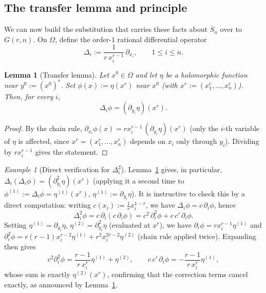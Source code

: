 \documentclass[11pt]{article}
\newtheorem{lemma}[theorem]{Lemma}
\theoremstyle{remark}
\newtheorem{example}[theorem]{Example}
\begin{document}
\subsection{The transfer lemma and principle}\label{sec:transfert}

We can now build the substitution that carries these facts about $S_n$ over to $G(r,n)$. On $\Omega$, define the order-$1$ rational differential operator
\[
\Delta_i := \frac{1}{r\,x_i^{r-1}}\,\partial_{x_i}, \qquad 1\le i\le n.
\]

\begin{lemma}[Transfer lemma]\label{lem:transfert}
Let $x^0\in\Omega$ and let $\eta$ be a holomorphic function near $y^0:=(x^0)^r$. Set $\phi(x):=\eta(x^r)$ near $x^0$ (with $x^r:=(x_1^r,\dots,x_n^r)$). Then, for every $i$,
\[
\Delta_i \phi = (\partial_{y_i}\eta)(x^r).
\]
\end{lemma}

\begin{proof}
By the chain rule, $\partial_{x_i}\phi(x) = r x_i^{r-1}\,(\partial_{y_i}\eta)(x^r)$ (only the $i$-th variable of $\eta$ is affected, since $x^r=(x_1^r,\dots,x_n^r)$ depends on $x_i$ only through $y_i$). Dividing by $rx_i^{r-1}$ gives the statement.
\end{proof}

\begin{example}[Direct verification for $\Delta_i^2$]\label{ex:delta2}
Lemma~\ref{lem:transfert} gives, in particular, $\Delta_i(\Delta_i\phi)=(\partial_{y_i}^2\eta)(x^r)$ (applying it a second time to $\phi^{(1)}:=\Delta_i\phi=\eta^{(1)}(x^r)$, $\eta^{(1)}:=\partial_{y_i}\eta$). It is instructive to check this by a direct computation: writing $c(x_i):=\frac{1}{r}x_i^{1-r}$, we have $\Delta_i\phi=c\,\partial_i\phi$, hence
\[
\Delta_i^2\phi = c\,\partial_i(c\,\partial_i\phi) = c^2\,\partial_i^2\phi + c\,c'\,\partial_i\phi.
\]
Setting $\eta^{(1)}=\partial_{y_i}\eta$, $\eta^{(2)}=\partial_{y_i}^2\eta$ (evaluated at $x^r$), we have $\partial_i\phi = rx_i^{r-1}\eta^{(1)}$ and $\partial_i^2\phi = r(r-1)x_i^{r-2}\eta^{(1)}+r^2x_i^{2r-2}\eta^{(2)}$ (chain rule applied twice). Expanding then gives
\[
c^2\partial_i^2\phi = \frac{r-1}{r\,x_i^r}\eta^{(1)} + \eta^{(2)}, \qquad c\,c'\,\partial_i\phi = -\frac{r-1}{r\,x_i^r}\eta^{(1)},
\]
whose sum is exactly $\eta^{(2)}(x^r)$, confirming that the correction terms cancel exactly, as announced by Lemma~\ref{lem:transfert}.
\end{example}
\end{document}

